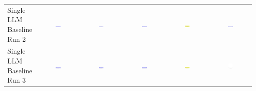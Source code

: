 \begin{table}
\begin{tabular}{@{}lccccc@{}}
    \makecell{Single LLM \\ Baseline \\ Run 2} & \includegraphics[width=0.13\textwidth]{./run_2/png/gpt-4o_results/ViaConnection.png} & \includegraphics[width=0.13\textwidth]{./run_2/png/o1-preview_results/ViaConnection.png} & \includegraphics[width=0.13\textwidth]{./run_2/png/claude-3-5-sonnet-20240620_results/ViaConnection.png} & \includegraphics[width=0.13\textwidth]{./run_2/png/watsonx_meta-llama_llama-3-1-70b-instruct_results/ViaConnection.png} & \includegraphics[width=0.13\textwidth]{./run_2/png/watsonx_meta-llama_llama-3-405b-instruct_results/ViaConnection.png} \\
    \makecell{Single LLM \\ Baseline \\ Run 3} & \includegraphics[width=0.13\textwidth]{./run_3/png/gpt-4o_results/ViaConnection.png} & \includegraphics[width=0.13\textwidth]{./run_3/png/o1-preview_results/ViaConnection.png} & \includegraphics[width=0.13\textwidth]{./run_3/png/claude-3-5-sonnet-20240620_results/ViaConnection.png} & \includegraphics[width=0.13\textwidth]{./run_3/png/watsonx_meta-llama_llama-3-1-70b-instruct_results/ViaConnection.png} & \includegraphics[width=0.13\textwidth]{./run_3/png/watsonx_meta-llama_llama-3-405b-instruct_results/ViaConnection.png} \\

\end{tabular}
\end{table}
